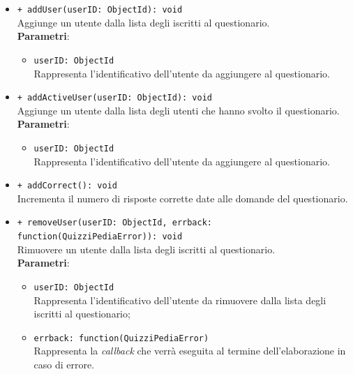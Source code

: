 \begin{itemize}
\begin{itemize}
			\item \texttt{+ addUser(userID: ObjectId): void}\\
			Aggiunge un utente dalla lista degli iscritti al questionario.\\
			\textbf{Parametri}:
			\begin{itemize}
				\item \texttt{userID: ObjectId}\\
				Rappresenta l'identificativo dell'utente da aggiungere al questionario.
			\end{itemize}
			
			\item \texttt{+ addActiveUser(userID: ObjectId): void}\\
			Aggiunge un utente dalla lista degli utenti che hanno svolto il questionario.\\
			\textbf{Parametri}:
			\begin{itemize}
				\item \texttt{userID: ObjectId}\\
				Rappresenta l'identificativo dell'utente da aggiungere al questionario.
			\end{itemize}
			
			\item \texttt{+ addCorrect(): void}\\
			Incrementa il numero di risposte corrette date alle domande del questionario.		
			
			\item \texttt{+ removeUser(userID: ObjectId, errback: function(QuizziPediaError)): void}\\
			Rimuovere un utente dalla lista degli iscritti al questionario.\\
			\textbf{Parametri}:
			\begin{itemize}
				\item \texttt{userID: ObjectId}\\
				Rappresenta l'identificativo dell'utente da rimuovere dalla lista degli iscritti al questionario;
				\item \texttt{errback: function(QuizziPediaError)}\\
				Rappresenta la \textit{callback} che verrà eseguita al termine dell'elaborazione in caso di errore.
			\end{itemize}
			

\end{itemize}
\end{itemize}
